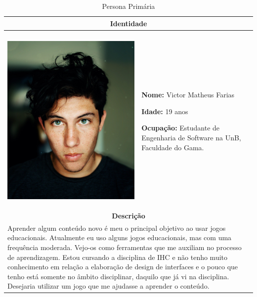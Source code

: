 \begin{table}[htbp]
\centering
\caption{Persona Primária}
\label{tab:Table_persona1}
\small
\begin{tabular}{| m{} m{}|}
\hline \multicolumn{2}{|c|}{\textbf{Identidade}} \\ \hline
& \\

\begin{center} \includegraphics[scale=0.06]{figuras/personas/portrait-3353699_1920.jpg} \end{center} 

&

\textbf{Nome: } Victor Matheus Farias

\textbf{Idade:} 19 anos

\textbf{Ocupação:} Estudante de Engenharia de Software na UnB, Faculdade do Gama.

\\ \hline


\multicolumn{2}{|c|}{\textbf{Descrição}} \\ \hline
\multicolumn{2}{|p{15cm}|}{
        Aprender algum conteúdo novo é meu o principal objetivo ao usar jogos educacionais. Atualmente eu uso alguns jogos educacionais, mas com uma frequência moderada. Vejo-os como ferramentas que me auxiliam no processo de aprendizagem. Estou cursando a disciplina de IHC e não tenho muito conhecimento em relação a elaboração de design de interfaces e o pouco que tenho está somente no âmbito disciplinar, daquilo que já vi na disciplina. Desejaria utilizar um jogo que me ajudasse a aprender o conteúdo.
       
}
\end{tabular}
\end{table}
